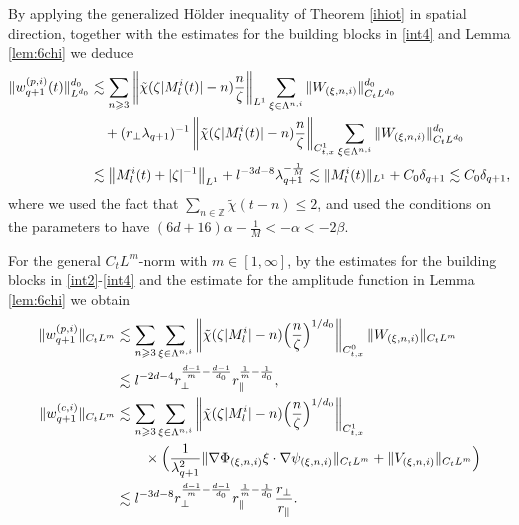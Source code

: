 \documentclass[UTF-8,reqno]{amsart}
\numberwithin{equation}{section}
\theoremstyle{definition}
\def\({{\Big(}}
\def\){{\Big)}}
\newcommand{\norm}[1]{\left\|#1\right\|}
\def\geq{\geqslant}
\def\leq{\leqslant}
\def\({{\Big(}}
\def\){{\Big)}}
\def\geq{\geqslant}
\def\leq{\leqslant}
\begin{document}
By applying the generalized H\"older inequality of 
Theorem \ref{ihiot} in spatial direction, together with the estimates for the building blocks in \eqref{int4} and Lemma \ref{lem:6chi} we deduce 
\begin{align}
\|w_{q+1}^{(p,i)}(t)\|^{d_0}_{L^{d_0}}%
&\lesssim\sum_{n\geq3}\norm{\tilde{\chi}(\zeta|M^{i}_l(t)|-n)\frac{n}{\zeta}}_{L^1}\sum_{\xi\in\Lambda^{n,i}}\|W_{(\xi,n,i)}\|_{C_tL^{d_0}}^{d_0}\notag\\ 
&\quad+(r_\perp\lambda_{q+1})^{-1}\norm{\tilde{\chi}(\zeta|M^{i}_l(t)|-n)\frac{n}{\zeta}}_{C_{t,x}^1}\sum_{\xi\in\Lambda^{n,i}}\|W_{(\xi,n,i)}\|_{C_tL^{d_0}}^{d_0} \notag\\
&\lesssim\norm{ M^{i}_l(t)+|\zeta|^{-1}
}_{L^1}+l^{-3d-8}\lambda_{q+1}^{-\frac{1}{M}} \lesssim \|M^{i}_l(t)\|_{L^1}+C_0 \delta_{q+1} \lesssim C_0\delta_{q+1} 
,\notag
\end{align}
where we used   the fact that $\sum_{n\in\mathbb{Z}} \tilde{\chi}(t - n) \leq2$, and used the conditions on the parameters to have $(6d+16)\alpha-\frac{1}{M}<-\alpha<-2\beta$.  

For the general $C_tL^m$-norm with $m\in[1,\infty]$, by the estimates for the building blocks in \eqref{int2}-\eqref{int4} 
and the estimate for the amplitude function in  Lemma \ref{lem:6chi} we obtain
\begin{align}
\|w_{q+1}^{(p,i)}\|_{C_tL^m}&\lesssim\sum_{n\geq3}\sum_{\xi\in\Lambda^{n,i}}\norm{\tilde{\chi}(\zeta|M^{i}_l|-n)\(\frac{n}{\zeta}\)^{1/d_0}}_{C_{t,x}^0}\|W_{(\xi,n,i)}\|_{C_tL^m}\notag\\
&\lesssim l^{-2d-4}r_\perp^{\frac{d-1}{m}-\frac{d-1}{d_0}} r_\parallel^{\frac{1}{m}-\frac{1}{d_0}},\label{bd:6wq+1plp}\\
\|w_{q+1}^{(c,i)}\|_{C_tL^m}&\lesssim\sum_{n\geq3}\sum_{\xi\in\Lambda^{n,i}}\norm{\tilde{\chi}(\zeta|M^{i}_l|-n)\(\frac{n}{\zeta}\)^{1/d_0}}_{C^1_{t,x}}\notag\\ 
&\quad\quad \times\(\frac{1}{\lambda_{q+1}^2}\|\nabla\Phi_{(\xi,n,i)} \xi\cdot\nabla\psi_{(\xi,n,i)} \|_{C_tL^m}+\|V_{(\xi,n,i)}\|_{C_tL^m}\)\notag\\
&\lesssim l^{-3d-8}r_\perp^{\frac{d-1}{m}-\frac{d-1}{d_0}} r_\parallel^{\frac{1}{m}-\frac{1}{d_0}}\frac{r_\perp}{ r_\parallel}.\label{bd:6wq+1clp}
\end{align}
\end{document}
